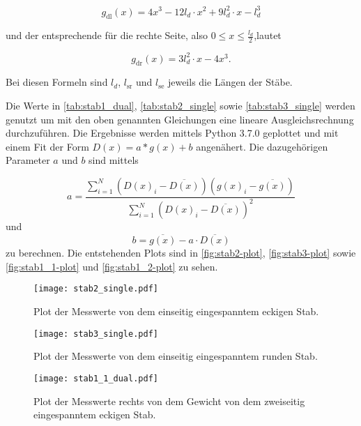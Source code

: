 \begin{equation}
  g_\text{dl}(x) = 4x^3 - 12l_d \cdot x^2 + 9l_d^2 \cdot x - l_d^3
\end{equation}

und der entsprechende für die rechte Seite, also $0 \leq x \leq \frac{l_d}{2}$,lautet

\begin{equation}
  g_\text{dr}(x) = 3 l_d^2 \cdot x - 4x^3.
\end{equation}

Bei diesen Formeln sind $l_d$, $l_\text{sr}$ und $l_\text{se}$ jeweils die Längen der Stäbe.





Die Werte in \autoref{tab:stab1_dual}, \autoref{tab:stab2_single} sowie \autoref{tab:stab3_single} werden genutzt um mit den oben genannten Gleichungen eine lineare Ausgleichsrechnung durchzuführen.
Die Ergebnisse werden mittels Python 3.7.0 geplottet und mit einem Fit der Form $D(x) = a * g(x) + b$ angenähert.
Die dazugehörigen Parameter $a$ und $b$ sind mittels



\begin{equation}
\label{eqn:a}
  a = \frac {\sum_{i=1}^N (D(x)_i - \overline{D(x)}) (g(x)_i - \overline{g(x)})}{\sum_{i=1}^N (D(x)_i - \overline{D(x)})^2}
\end{equation}
und
\begin{equation}
\label{eqn:b}
  b = \overline{g(x)} - a \cdot \overline{D(x)}
\end{equation}
zu berechnen.
Die entstehenden Plots sind in \autoref{fig:stab2-plot}, \autoref{fig:stab3-plot} sowie \autoref{fig:stab1_1-plot} und \autoref{fig:stab1_2-plot} zu sehen.

\begin{figure}
  \centering
  \texttt{[image: stab2\_single.pdf]}
  \caption{Plot der Messwerte von dem einseitig eingespanntem eckigen Stab.}
  \label{fig:stab2-plot}
\end{figure}

\begin{figure}
  \centering
  \texttt{[image: stab3\_single.pdf]}
  \caption{Plot der Messwerte von dem einseitig eingespanntem runden Stab.}
  \label{fig:stab3-plot}
\end{figure}

\begin{figure}
  \centering
  \texttt{[image: stab1\_1\_dual.pdf]}
  \caption{Plot der Messwerte rechts von dem Gewicht von dem zweiseitig eingespanntem eckigen Stab.}
  \label{fig:stab1_1-plot}
\end{figure}

